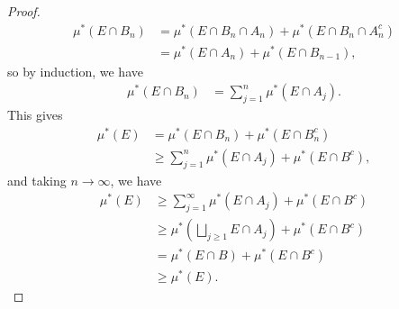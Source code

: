 \documentclass[10pt]{mypackage}
\begin{document}
\begin{proof}
  \begin{align*}
    \mu^{\ast}\left( E\cap B_n \right) &= \mu^{\ast}\left( E\cap B_n\cap A_n \right) + \mu^{\ast}\left( E\cap B_n\cap A_n^{c} \right)\\
                                       &= \mu^{\ast}\left( E\cap A_n \right) + \mu^{\ast}\left( E\cap B_{n-1} \right),
  \end{align*}
  so by induction, we have
  \begin{align*}
    \mu^{\ast}\left( E\cap B_n \right) &= \sum_{j=1}^{n} \mu^{\ast}\left( E\cap A_j \right).
  \end{align*}
  This gives
  \begin{align*}
    \mu^{\ast}\left( E \right) &= \mu^{\ast}\left( E\cap B_n \right) + \mu^{\ast}\left( E\cap B_n^{c} \right)\\
                               &\geq \sum_{j=1}^{n}\mu^{\ast}\left( E\cap A_j \right) + \mu^{\ast}\left( E\cap B^c \right),
  \end{align*}
  and taking $n\rightarrow\infty$, we have
  \begin{align*}
    \mu^{\ast}\left( E \right) &\geq \sum_{j=1}^{\infty} \mu^{\ast}\left( E\cap A_j \right) + \mu^{\ast}\left( E\cap B^c \right)\\
                               &\geq \mu^{\ast}\left( \bigsqcup_{j\geq 1}E\cap A_j \right) + \mu^{\ast}\left( E\cap B^c \right)\\
                               &= \mu^{\ast}\left( E\cap B \right) + \mu^{\ast}\left( E\cap B^{c} \right)\\
                               &\geq \mu^{\ast}\left( E \right).
  \end{align*}
  
\end{proof}
\end{document}

